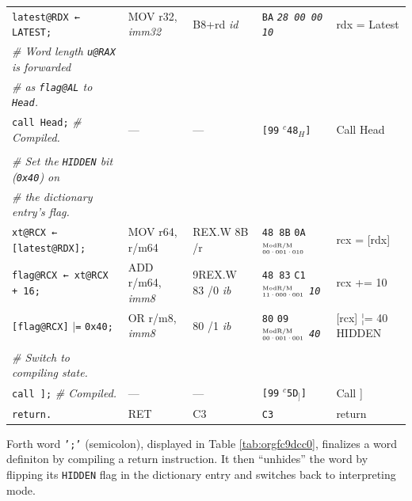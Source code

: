 \documentclass[a4paper,12pt,final]{article}
\begin{document}
\begin{table}[!htbp]
\begin{adjustwidth}{-1cm}{-1cm}
\begin{center}
\begin{tabular}{l|ll|lH}
\texttt{latest@RDX ← LATEST;} & MOV r32, \emph{imm32} & B8+rd \emph{id} & \texttt{BA} \emph{\texttt{28 00 00 10}} & rdx = Latest\\[0pt]
\emph{\# Word length \texttt{u@RAX} is forwarded} &  &  &  & \\[0pt]
\emph{\# as \texttt{flag@AL} to \texttt{Head}.} &  &  &  & \\[0pt]
\texttt{call Head;}  \emph{\# Compiled.} & --- & --- & \texttt{[99} \(^{c}\)​\texttt{48}​\(_{H}\)​\texttt{]} & Call Head\\[0pt]
 &  &  &  & \\[0pt]
\emph{\# Set the \texttt{HIDDEN} bit (\texttt{0x40}) on} &  &  &  & \\[0pt]
\emph{\# the dictionary entry's flag.} &  &  &  & \\[0pt]
\texttt{xt@RCX ← [latest@RDX];} & MOV r64, r/m64 & REX.W 8B /r & \texttt{48 8B} \texttt{0A}​\(^{\text{\tiny ModR/M}}_{\text{\tiny 00·001·010}}\) & rcx = [rdx]\\[0pt]
\texttt{flag@RCX ← xt@RCX + 16;} & ADD r/m64, \emph{imm8} & 9REX.W 83 /​0 \emph{ib} & \texttt{48 83} \texttt{C1}​\(^{\text{\tiny ModR/M}}_{\text{\tiny 11·000·001}}\) \emph{\texttt{10}} & rcx += 10\\[0pt]
\texttt{[flag@RCX]} \(\vert{}\)​\texttt{=} \texttt{0x40;} & OR r/m8, \emph{imm8} & 80 /​1 \emph{ib} & \texttt{80} \texttt{09}​\(^{\text{\tiny ModR/M}}_{\text{\tiny 00·001·001}}\) \emph{\texttt{40}} & [rcx] ¦= 40 HIDDEN\\[0pt]
 &  &  &  & \\[0pt]
\emph{\# Switch to compiling state.} &  &  &  & \\[0pt]
\texttt{call ];}  \emph{\# Compiled.} & --- & --- & \texttt{[99} \(^{c}\)​\texttt{5D}​\(_{]}\)​\texttt{]} & Call ]\\[0pt]
\texttt{return.} & RET & C3 & \texttt{C3} & return\\[0pt]
\end{tabular}

\end{center}
\normalsize \end{adjustwidth} \end{table} \vspace{0}

Forth word \texttt{';'} (semicolon), displayed in Table
\ref{tab:orgfc9dcc0}, finalizes a word definiton by compiling a
return instruction.  It then ``unhides'' the word by flipping its
\texttt{HIDDEN} flag in the dictionary entry and switches back to
interpreting mode.
\end{document}
